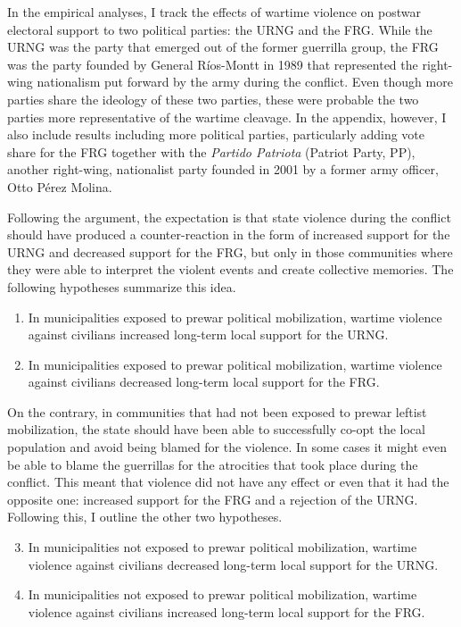 \documentclass[12pt, notitlepage]{article}
\begin{document}
In the empirical analyses, I track the effects of wartime violence on postwar electoral support to two political parties: the URNG and the FRG.
While the URNG was the party that emerged out of the former guerrilla group, the FRG was the party founded by General Ríos-Montt in 1989 that represented the right-wing nationalism put forward by the army during the conflict.
Even though more parties share the ideology of these two parties, these were probable the two parties more representative of the wartime cleavage.
In the appendix, however, I also include results including more political parties, particularly adding vote share for the FRG together with the \textit{Partido Patriota} (Patriot Party, PP), another right-wing, nationalist party founded in 2001 by a former army officer, Otto Pérez Molina.

Following the argument, the expectation is that state violence during the conflict should have produced a counter-reaction in the form of increased support for the URNG and decreased support for the FRG, but only in those communities where they were able to interpret the violent events and create collective memories.
The following hypotheses summarize this idea.

\begin{enumerate}[label={\bf H\arabic*:} , ref=H\arabic* , wide=0.5em, leftmargin=*]
  \item \label{h:urng-mob} In municipalities exposed to prewar political mobilization, wartime violence against civilians increased long-term local support for the URNG.
  \item \label{h:frg-mob} In municipalities exposed to prewar political mobilization, wartime violence against civilians decreased long-term local support for the FRG.
\end{enumerate}

On the contrary, in communities that had not been exposed to prewar leftist mobilization, the state should have been able to successfully co-opt the local population and avoid being blamed for the violence.
In some cases it might even be able to blame the guerrillas for the atrocities that took place during the conflict.
This meant that violence did not have any effect or even that it had the opposite one: increased support for the FRG and a rejection of the URNG.
Following this, I outline the other two hypotheses.

\begin{enumerate}[label={\bf H\arabic*:} , ref=H\arabic* , wide=0.5em, leftmargin=*]
  \setcounter{enumi}{2}
  \item \label{h:urng-no-mob} In municipalities not exposed to prewar political mobilization, wartime violence against civilians decreased long-term local support for the URNG.
  \item \label{h:frg-no-mob} In municipalities not exposed to prewar political mobilization, wartime violence against civilians increased long-term local support for the FRG.
\end{enumerate}
\end{document}
